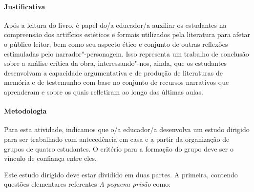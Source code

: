 \documentclass[11pt]{extarticle}
\begin{document}
\paragraph{Justificativa} Após a leitura do livro, é papel do/a educador/a
auxiliar os estudantes na compreensão dos artifícios estéticos e formais
utilizados pela literatura para afetar o público leitor, bem como seu
aspecto ético e conjunto de outras reflexões estimuladas pelo
narrador"-personagem. Isso representa um trabalho de conclusão sobre a
análise crítica da obra, interessando"-nos, ainda, que os estudantes
desenvolvam a capacidade argumentativa e de produção de literaturas de
memória e de testemunho com base no conjunto de recursos narrativos que
aprenderam e sobre os quais refletiram ao longo das últimas aulas.


\paragraph{Metodologia} 

Para esta atividade, indicamos que o/a educador/a
desenvolva um estudo dirigido para ser trabalhado com antecedência em
casa e a partir da organização de grupos de quatro estudantes. O critério
para a formação do grupo deve ser o vínculo de confiança entre eles.


Este estudo dirigido deve estar dividido em duas partes. A primeira, 
contendo questões elementares referentes \emph{A pequena prisão}
como:
\end{document}
